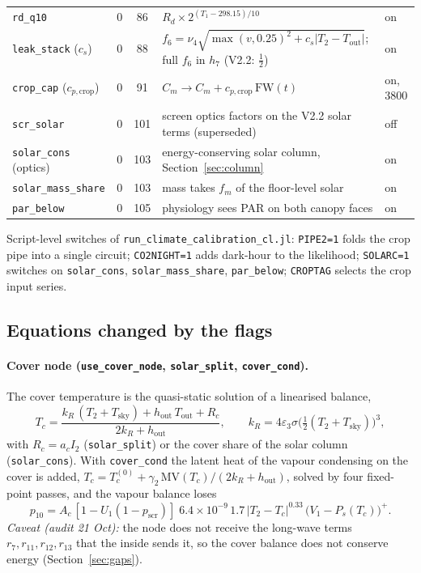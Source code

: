 \documentclass[11pt,a4paper]{article}
\begin{document}
{\begin{longtable}{>{\raggedright\arraybackslash}p{}c c>{\raggedright\arraybackslash}p{}>{\raggedright\arraybackslash}p{}}
\texttt{rd\_q10} & 0 & 86 & $R_d\times 2^{(T_1-298.15)/10}$ & on\\
\texttt{leak\_stack} ($c_s$) & 0 & 88 & $f_6=\nu_4\sqrt{\max(v,0.25)^2+c_s|T_2-T_{\text{out}}|}$; full $f_6$ in $h_7$ (V2.2: $\tfrac12$) & on\\
\texttt{crop\_cap} ($c_{p,\text{crop}}$) & 0 & 91 & $C_m\to C_m+c_{p,\text{crop}}\,\mathrm{FW}(t)$ & on, 3800\\
\texttt{scr\_solar} & 0 & 101 & screen optics factors on the V2.2 solar terms (superseded) & off\\
\texttt{solar\_cons} (optics) & 0 & 103 & energy-conserving solar column, Section~\ref{sec:column} & on\\
\texttt{solar\_mass\_share} & 0 & 103 & mass takes $f_m$ of the floor-level solar & on\\
\texttt{par\_below} & 0 & 105 & physiology sees PAR on both canopy faces & on\\
\bottomrule
\end{longtable}}

Script-level switches of \texttt{run\_climate\_calibration\_cl.jl}: \texttt{PIPE2=1} folds the crop pipe
into a single circuit; \texttt{CO2NIGHT=1} adds dark-hour  to the likelihood; \texttt{SOLARC=1}
switches on \texttt{solar\_cons}, \texttt{solar\_mass\_share}, \texttt{par\_below}; \texttt{CROPTAG} selects the
crop input series.

\subsection{Equations changed by the flags}

\paragraph{Cover node (\texttt{use\_cover\_node}, \texttt{solar\_split}, \texttt{cover\_cond}).}
The cover temperature is the quasi-static solution of a linearised balance,
\begin{equation}\label{eq:cover}
T_c=\frac{k_R\,(T_2+T_{\text{sky}})+h_{\text{out}}\,T_{\text{out}}+R_c}{2k_R+h_{\text{out}}},\qquad
k_R=4\varepsilon_3\sigma\bigl(\tfrac12(T_2+T_{\text{sky}})\bigr)^3,
\end{equation}
with $R_c=a_cI_2$ (\texttt{solar\_split}) or the cover share of the solar column (\texttt{solar\_cons}).
With \texttt{cover\_cond} the latent heat of the vapour condensing on the cover is added,
$T_c=T_c^{(0)}+\gamma_2\,\mathrm{MV}(T_c)/(2k_R+h_{\text{out}})$, solved by four fixed-point passes, and
the vapour balance loses
\begin{equation}\label{eq:covcond}
p_{10}=A_c\,[1-U_1(1-p_{\text{scr}})]\;6.4\!\times\!10^{-9}\,1.7\,|T_2-T_c|^{0.33}\,\bigl(V_1-P_s(T_c)\bigr)^+ .
\end{equation}
\emph{Caveat (audit 21 Oct):} the node does not receive the long-wave terms $r_7,r_{11},r_{12},r_{13}$ that the
inside sends it, so the cover balance does not conserve energy (Section~\ref{sec:gaps}).
\end{document}
